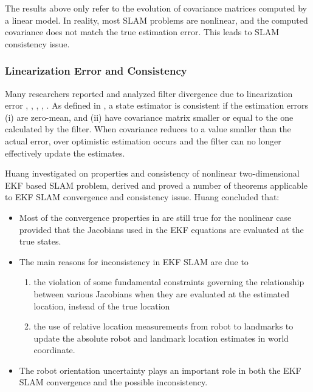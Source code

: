 The results above only refer to the evolution of covariance matrices
computed by a linear model. In reality, most SLAM problems are nonlinear, and
the computed covariance does not match the true estimation error. This
leads to SLAM consistency issue.

\subsubsection{Linearization Error and Consistency}
Many researchers reported and analyzed filter divergence due to
linearization error \cite{martinelli_results_2005},
\cite{julier_counter_2001}, \cite{bailey_consistency_2006},
\cite{frese_discussion_2006}, \cite{castellanos_limits_2004}. As
defined in \cite{huang_analysis_2008}, a state estimator is consistent
if the estimation errors (i) are zero-mean, and (ii) have covariance
matrix smaller or equal to the one calculated by the filter. When
covariance reduces to a value smaller than the actual error, over
optimistic estimation occurs and the filter can no longer effectively
update the estimates.

Huang investigated \cite{huang_convergence_2007} on properties and
consistency of nonlinear two-dimensional EKF based SLAM problem,
derived and proved a number of theorems applicable to EKF SLAM
convergence and consistency issue. Huang concluded that:

\begin{itemize}
  \item Most of the convergence properties in
  \cite{dissanayake_solution_2001} are still true for the nonlinear
  case provided that the Jacobians used in the EKF equations are
  evaluated at the true states.
  \item The main reasons for inconsistency in EKF SLAM are due to 
  \begin{enumerate}
    \item the violation of some fundamental constraints governing the
    relationship between various Jacobians when they are evaluated at
    the estimated location, instead of the true location
    \item the use of relative location measurements from robot to
    landmarks to update the absolute robot and landmark location
    estimates in world coordinate.
  \end{enumerate}
  \item The robot orientation uncertainty plays an important role in
  both the EKF SLAM convergence and the possible inconsistency.
\end{itemize}

